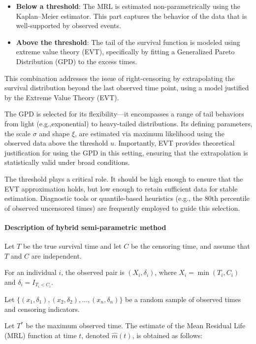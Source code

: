 \documentclass[
  onecolumn]{article}
\begin{document}
\begin{itemize}
 \item \textbf{Below a threshold}: The MRL is estimated non-parametrically using the Kaplan–Meier estimator. This part captures the behavior of the data that is well-supported by observed events.
 \item \textbf{Above the threshold}: The tail of the survival function is modeled using extreme value theory (EVT), specifically by fitting a Generalized Pareto Distribution (GPD) to the excess times.
\end{itemize}

This combination addresses the issue of right-censoring by extrapolating
the survival distribution beyond the last observed time point, using a
model justified by the Extreme Value Theory (EVT).

The GPD is selected for its flexibility---it encompasses a range of tail
behaviors from light (e.g.,exponential) to heavy-tailed distributions.
Its defining parameters, the scale \(\sigma\) and shape \(\xi\), are
estimated via maximum likelihood using the observed data above the
threshold \(u\). Importantly, EVT provides theoretical justification for
using the GPD in this setting, ensuring that the extrapolation is
statistically valid under broad conditions.

The threshold plays a critical role. It should be high enough to ensure
that the EVT approximation holds, but low enough to retain sufficient
data for stable estimation. Diagnostic tools or quantile-based
heuristics (e.g., the 80th percentile of observed uncensored times) are
frequently employed to guide this selection.

\paragraph{Description of hybrid semi-parametric
method}\label{description-of-hybrid-semi-parametric-method}

Let \(T\) be the true survival time and let \(C\) be the censoring time,
and assume that \(T\) and \(C\) are independent.

For an individual \(i\), the observed pair is \((X_i, \delta_i)\), where
\(X_i = \min(T_i, C_i)\) and \(\delta_i = I_{T_i < C_i}\).

Let \(\{(x_1, \delta_1), (x_2, \delta_2), \dots, (x_n, \delta_n)\}\) be
a random sample of observed times and censoring indicators.

Let \(T^*\) be the maximum observed time. The estimate of the Mean
Residual Life (MRL) function at time \(t\), denoted \(\hat{m}(t)\), is
obtained as follows:
\end{document}
